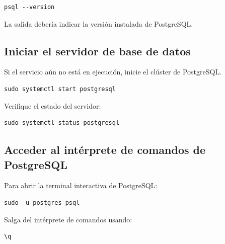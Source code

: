 \begin{lstlisting}[basicstyle=\footnotesize\ttfamily]
psql --version
\end{lstlisting}

La salida debería indicar la versión instalada de PostgreSQL.

\subsection{Iniciar el servidor de base de datos}
Si el servicio aún no está en ejecución, inicie el clúster de PostgreSQL.

\begin{lstlisting}[basicstyle=\footnotesize\ttfamily]
sudo systemctl start postgresql
\end{lstlisting}

Verifique el estado del servidor:

\begin{lstlisting}[basicstyle=\footnotesize\ttfamily]
sudo systemctl status postgresql
\end{lstlisting}

\subsection{Acceder al intérprete de comandos de PostgreSQL}
Para abrir la terminal interactiva de PostgreSQL:

\begin{lstlisting}[basicstyle=\footnotesize\ttfamily]
sudo -u postgres psql
\end{lstlisting}

Salga del intérprete de comandos usando:

\begin{lstlisting}[basicstyle=\footnotesize\ttfamily]
\q
\end{lstlisting}
